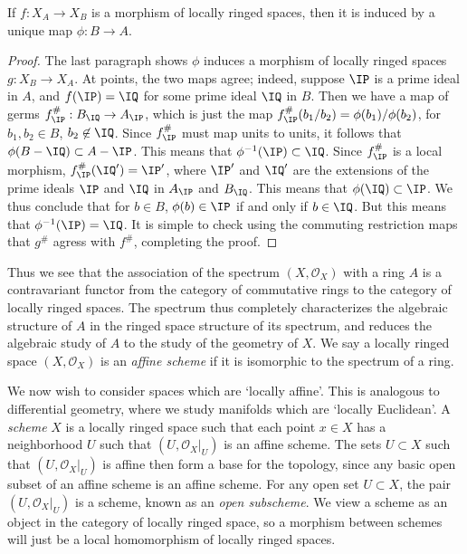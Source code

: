 \begin{theorem}
    If $f: X_A \to X_B$ is a morphism of locally ringed spaces, then it is induced by a unique map $\phi: B \to A$.
\end{theorem}
\begin{proof}
    The last paragraph shows $\phi$ induces a morphism of locally ringed spaces $g: X_B \to X_A$. At points, the two maps agree; indeed, suppose $\IP$ is a prime ideal in $A$, and $f(\IP) = \IQ$ for some prime ideal $\IQ$ in $B$. Then we have a map of germs $f^\#_{\IP}: B_{\IQ} \to A_{\IP}$, which is just the map $f^\#_{\IP}(b_1/b_2) = \phi(b_1)/\phi(b_2)$, for $b_1,b_2 \in B$, $b_2 \not \in \IQ$. Since $f^\#_{\IP}$ must map units to units, it follows that $\phi(B - \IQ) \subset A - \IP$. This means that $\phi^{-1}(\IP) \subset \IQ$. Since $f^\#_{\IP}$ is a local morphism, $f^\#_{\IP}(\IQ') = \IP'$, where $\IP'$ and $\IQ'$ are the extensions of the prime ideals $\IP$ and $\IQ$ in $A_{\IP}$ and $B_{\IQ}$. This means that $\phi(\IQ) \subset \IP$. We thus conclude that for $b \in B$, $\phi(b) \in \IP$ if and only if $b \in \IQ$. But this means that $\phi^{-1}(\IP) = \IQ$. It is simple to check using the commuting restriction maps that $g^\#$ agress with $f^\#$, completing the proof.
\end{proof}

Thus we see that the association of the spectrum $(X,\mathcal{O}_X)$ with a ring $A$ is a contravariant functor from the category of commutative rings to the category of locally ringed spaces. The spectrum thus completely characterizes the algebraic structure of $A$ in the ringed space structure of its spectrum, and reduces the algebraic study of $A$ to the study of the geometry of $X$. We say a locally ringed space $(X,\mathcal{O}_X)$ is an \emph{affine scheme} if it is isomorphic to the spectrum of a ring.

We now wish to consider spaces which are `locally affine'. This is analogous to differential geometry, where we study manifolds which are `locally Euclidean'. A \emph{scheme} $X$ is a locally ringed space such that each point $x \in X$ has a neighborhood $U$ such that $(U,\mathcal{O}_X|_U)$ is an affine scheme. The sets $U \subset X$ such that $(U,\mathcal{O}_X|_U)$ is affine then form a base for the topology, since any basic open subset of an affine scheme is an affine scheme. For any open set $U \subset X$, the pair $(U,\mathcal{O}_X|_U)$ is a scheme, known as an \emph{open subscheme}. We view a scheme as an object in the category of locally ringed space, so a morphism between schemes will just be a local homomorphism of locally ringed spaces.

